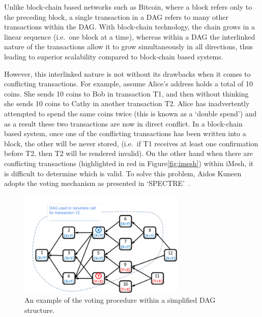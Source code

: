 \documentclass[a4paper,10pt,twocolumn]{article}
\begin{document}
	\vspace{-3.5mm}
	
	Unlike block-chain based networks such as Bitcoin, where a block refers only to the preceding block, a single transaction in a DAG 
	refers to many other transactions within the DAG\@. With block-chain technology, the chain grows in a linear sequence (i.e.\ one block at a 
	time), whereas within a DAG the interlinked nature of the transactions allow it to grow simultaneously in all directions, thus leading 
	to superior scalability compared to block-chain based systems.
	
	\vspace{2.5mm}
	
	However, this interlinked nature is not without its drawbacks when it comes to conflicting transactions. For example, assume Alice's 
	address holds a total of 10 coins. She sends 10 coins to Bob in transaction T1, and then without thinking she sends 10 coins to Cathy 
	in another transaction T2. Alice has inadvertently attempted to spend the same coins twice (this is known as a `double spend')
	and as a result these two transactions are now in direct conflict. In a block-chain based system, once one of the conflicting 
	transactions has been written into a block, the other will be never stored, (i.e.\ if T1 receives at least one confirmation before T2, 
	then T2 will be rendered invalid). On the other hand when there are conflicting transactions (highlighted in red in 
	Figure\ref{fig:imesh}) within iMesh, it is difficult to determine which is valid. To solve this problem, Aidos Kuneen adopts the voting 
	mechanism as presented in `SPECTRE'~\cite{spectre}.
	
	
	\begin{figure}[ht]
		\begin{center}
		\includegraphics[width=80mm]{spectre.png}
		  \caption{An example of the voting procedure within a simplified DAG structure.}
		\label{fig:spectre}
		\end{center}
	 \end{figure}
	
\end{document}
